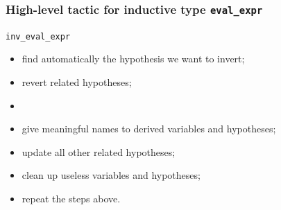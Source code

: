 \documentclass[usenames,dvipsnames]{beamer} %
\begin{document}



\begin{frame}[fragile]
\frametitle{High-level tactic for inductive type \texttt{eval\_expr}}
\begin{block}{\texttt{inv\_eval\_expr}}
\begin{itemize}
\item 
find automatically the hypothesis we want
to invert; %
\item 
revert related hypotheses;
\item 
{}
\item 
give meaningful names to derived variables and hypotheses;
\item 
update all other related hypotheses;%
\item 
clean up useless variables and hypotheses;
\item 
repeat the steps above.%
\end{itemize}
\end{block}
\end{frame}
\end{document}
